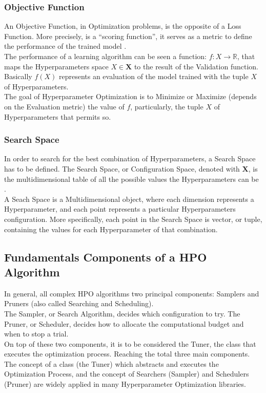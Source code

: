 \subsubsection{Objective Function}

An Objective Function, in Optimization problems, is the opposite of a Loss Function. More precisely, is a “scoring function”, it serves as a metric to define the performance of the trained model \cite{Tesi-1.1} \cite{Tesi-1.6}.
\\[0.3cm]The performance of a learning algorithm can be seen a function:  $f: X \to \mathbb{R}$, that maps the Hyperparameters space $X \in \textbf{X}$ to the result of the Validation function.
Basically $f(X)$ represents an evaluation of the model trained with the tuple $X$ of Hyperparameters.
\\[0.3cm]The goal of Hyperparameter Optimization is to Minimize or Maximize (depends on the Evaluation metric) the value of $f$, particularly, the tuple $X$ of Hyperparameters that permits so.

\subsubsection{Search Space}

In order to search for the best combination of Hyperparameters, a Search Space has to be defined.
The Search Space, or Configuration Space, denoted with $\textbf{X}$, is the multidimensional table of all the possible values the Hyperparameters can be \cite{Tesi-1.6}.
\\[0.3cm]A Seach Space is a Multidimensional object, where each dimension represents a Hyperparameter, and each point represents a particular Hyperparameters configuration.
More specifically, each point in the Search Space is vector, or tuple, containing the values for each Hyperparameter of that combination.

\subsection{Fundamentals Components of a HPO Algorithm}

In general, all complex HPO algorithms two principal components: Samplers and Pruners (also called Searching and Scheduling).
\\[0.3cm]The Sampler, or Search Algorithm, decides which configuration to try.
The Pruner, or Scheduler, decides how to allocate the computational budget and when to stop a trial.
\\[0.3cm]On top of these two components, it is to be considered the Tuner, the class that executes the optimization process. Reaching the total three main components.
\\[0.3cm]The concept of a class (the Tuner) which abstracts and executes the Optimization Process, and the concept of Searchers (Sampler) and Schedulers (Pruner) are widely applied in many Hyperparameter Optimization libraries.

